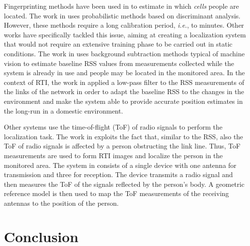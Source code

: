 \documentclass[conference]{IEEEtran}
\begin{document}
Fingerprinting methods have been used in \cite{Xu_2013,Xu_2012} to estimate in which \emph{cells} people are located. The work in \cite{Xu_2012} uses probabilistic methods based on discriminant analysis. However, these methods require a long calibration period, \emph{i.e.},  to  minutes. Other works have specifically tackled this issue, aiming at creating a localization system that would not require an extensive training phase to be carried out in static conditions. The work in \cite{Rabbat_background} uses background subtraction methods typical of machine vision to estimate baseline RSS values from measurements collected while the system is already in use and people may be located in the monitored area. In the context of RTI, the work in \cite{Grandma_2012} applied a low-pass filter to the RSS measurements of the links of the network in order to adapt the baseline RSS to the changes in the environment and make the system able to provide accurate position estimates in the long-run in a domestic environment.

Other systems use the time-of-flight (ToF) of radio signals to perform the localization task. The work in \cite{ToF_RTI} exploits the fact that, similar to the RSS, also the ToF of radio signals is affected by a person obstructing the link line. Thus, ToF measurements are used to form RTI images and localize the person in the monitored area. The system in \cite{MIT_3D_tracking} consists of a single device with one antenna for transmission and three for reception. The device transmits a radio signal and then measures the ToF of the signals reflected by the person's body. A geometric reference model is then used to map the ToF measurements of the receiving antennas to the position of the person.









\section{Conclusion}
\label{sec:conclusion}
\end{document}
